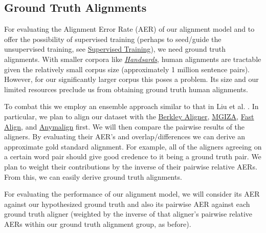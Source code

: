 \documentclass[twoside,twocolumn]{article}
\begin{document}
\subsection{Ground Truth Alignments}
\label{subsec:ground-truth-alignments}

For evaluating the Alignment Error Rate (AER) of our alignment model and to
offer the possibility of supervised training (perhaps to seed/guide the
unsupervised training, see
\hyperref[sec:supervised-training]{Supervised Training}), we need ground truth
alignments. With smaller corpora like
\href{https://www.isi.edu/natural-language/download/hansard/}{\textit{Handsards}},
human alignments are tractable given the relatively small corpus size
(approximately 1 million sentence pairs). However, for our significantly larger
corpus this poses a problem. Its size and our limited resources preclude us
from obtaining ground truth human alignments.

To combat this we employ an ensemble approach similar to that in Liu et al.
\cite{liu2015streaming}. In particular, we plan to align our dataset with
the
\href{http://nlp.cs.berkeley.edu/projects/historical.shtml#WordAligner}{Berkley Aligner},
\href{https://clear.colorado.edu/CompSemWiki/index.php/MGIZA\%2B\%2B}{MGIZA},
\href{https://github.com/clab/fast\_align}{Fast Align}, and
\href{https://anymalign.limsi.fr/}{Anymalign} first. We will then compare the
pairwise results of the aligners. By evaluating their AER's and
overlap/differences we can derive an approximate gold standard alignment. For
example, all of the aligners agreeing on a certain word pair should give good
credence to it being a ground truth pair. We plan to weight their contributions
by the inverse of their pairwise relative AERs. From this, we can easily derive
ground truth alignments.

For evaluating the performance of our alignment model, we will consider its
AER against our hypothesized ground truth and also its pairwise AER against
each ground truth aligner (weighted by the inverse of that aligner's pairwise
relative AERs within our ground truth alignment group, as before).


\end{document}
